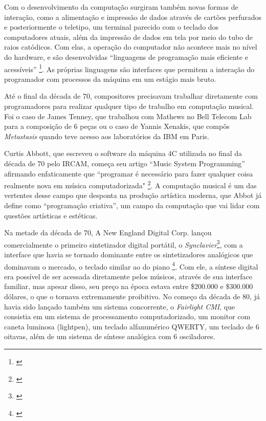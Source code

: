 Com o desenvolvimento da computação surgiram também novas formas de interação, como a alimentação e impressão de dados através de cartões perfurados e posteriormente o teletipo, um terminal parecido com o teclado dos computadores atuais, além da impressão de dados em tela por meio do tubo de raios catódicos. Com elas, a operação do computador não acontece mais no nível do hardware, e são desenvolvidas ``linguagens de programação mais eficiente e acessíveis'' \footnote{\cite[111]{IAZZETTA1997}}. As próprias linguagens são interfaces que permitem a interação do programador com processos da máquina em um estágio mais bruto.

Até o final da década de 70, compositores precisavam trabalhar diretamente com programadores para realizar qualquer tipo de trabalho em computação musical. Foi o caso de James Tenney, que trabalhou com Mathews no Bell Telecom Lab para a composição de 6 peças ou o caso de Yannis Xenakis, que compôs \emph{Metastasis} quando teve acesso aos laboratórios da IBM em Paris\cite{Holmes1985}. 

Curtis Abbott, que escreveu o software da máquina 4C utilizada no final da década de 70 pelo IRCAM, começa seu artigo ``Music System Programming'' afirmando enfaticamente que ``programar é necessário para fazer qualquer coisa realmente nova em música computadorizada" \footnote{\cite[51]{Roads1996}}. A computação musical é um das vertentes desse campo que desponta na produção artística moderna, que Abbot já define como ``programação criativa'', um campo da computação que vai lidar com questões artísticas e estéticas. 

Na metade da década de 70, A New England Digital Corp. lançou comercialmente o primeiro sintetizador digital portátil, o \emph{Synclavier}\footnote{\cite[265]{Holmes1985}}, com a interface que havia se tornado dominante entre os sintetizadores analógicos que dominavam o mercado, o teclado similar ao do piano \footnote{\cite{JosephParadiso1998}}. Com ele, a síntese digital era possível de ser acessada diretamente pelos músicos, através de sua interface familiar, mas apesar disso, seu preço na época estava entre \$200.000 e \$300.000 dólares, o que o tornava extremamente proibitivo. No começo da década de 80, já havia sido lançado também um sistema concorrente, o \emph{Fairlight CMI}, que consistia em um sistema de processamento computadorizado, um monitor com caneta luminosa (lightpen), um teclado alfanumérico QWERTY, um teclado de 6 oitavas, além de um sistema de síntese analógica com 6 osciladores.

